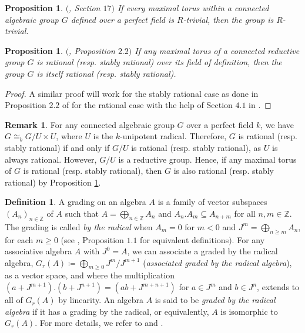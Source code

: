 \documentclass[12pt]{amsart}
\newtheorem{proposition}[theorem]{Proposition}
\theoremstyle{definition}
\newtheorem{definition}[theorem]{Definition}
\newtheorem{remark}[theorem]{Remark}
\numberwithin{equation}{section}
\begin{document}
\begin{proposition}\label{Proposition 4.7}
$($\cite{Voskrenskii}, \emph{Section} $17)$ If every maximal torus within a connected algebraic group \( G \) defined over a perfect field is \( R \)-trivial, then the group is \( R \)-trivial.
\end{proposition}

\vskip2mm

\begin{proposition}\label{Proposition 4.8}
$($\cite{CM}, \emph{Proposition} $2.2)$ If any maximal torus of a connected reductive group $G$ is rational (resp. stably rational) over its field of definition, then the group $G$ is itself rational (resp. stably rational). 
\end{proposition}
\vskip1mm
\begin{proof}
A similar proof will work for the stably rational case as done in Proposition $2.2$ of \cite{CM} for the rational case with the help of Section $4.1$ in \cite{Voskrenskii}.
\end{proof}
\vskip2mm
\begin{remark}\label{Remark 4.9}
For any connected algebraic group $G$ over a perfect field $k$, we have $G\cong_{b} G/U\times U$, where $U$ is the $k$-unipotent radical. Therefore, $G$ is rational (resp. stably rational) if and only if $G/U$ is rational (resp. stably rational), as $U$ is always rational. However, $G/U$ is a reductive group. Hence, if any maximal torus of $G$ is rational (resp. stably rational), then $G$ is also rational (resp. stably rational) by Proposition \ref{Proposition 4.8}.
\end{remark}
\vskip2mm
\begin{definition}\label{Definition 4.10}
A grading on an algebra $A$ is a family of vector subspaces $(A_n)_{n\in\mathbb{Z}}$ of $A$ such that $A=\bigoplus_{n\in\mathbb{Z}} A_n$ and $A_n.A_m\subseteq A_{n+m}$ for all $n,m\in \mathbb{Z}$. The grading is called \emph{by the radical} when $A_m=0$ for $m<0$ and $J^m=\bigoplus_{n\geq m} A_n$, for each $m\geq 0$ (see \cite{Saorin}, Proposition $1.1$ for equivalent definitions$)$.  For any associative algebra $A$ with $J^0=A$, we can associate a graded by the radical algebra, $G_{r}(A)\coloneq \bigoplus_{m\geq 0} J^m/J^{m+1}$ (\emph{associated graded by the radical algebra}), as a vector space, and where the multiplication $(a+J^{m+1}). (b+J^{n+1})=(ab+J^{m+n+1})$ for $a\in J^{m}$ and $b\in J^{n}$, extends to all of $G_{r}(A)$ by linearity. An algebra $A$ is said to be \emph{graded by the radical algebra} if it has a grading by the radical, or equivalently, $A$ is isomorphic to $G_{r} (A)$. For more details, we refer to \cite{AS1} and \cite{Saorin}.
\end{definition}
\end{document}
